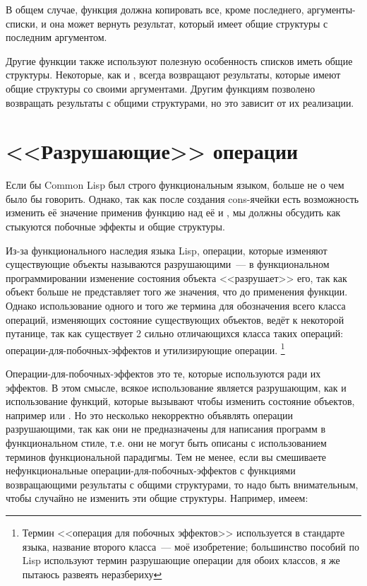 
В общем случае, функция  должна копировать все, кроме последнего,
аргументы-списки, и она может вернуть результат, который имеет общие структуры с последним
аргументом.

Другие функции также используют полезную особенность списков иметь общие
структуры. Некоторые, как и , всегда возвращают результаты, которые имеют
общие структуры со своими аргументами. Другим функциям позволено возвращать результаты с
общими структурами, но это зависит от их реализации.

\section{<<Разрушающие>> операции}

Если бы Common Lisp был строго функциональным языком, больше не о чем было бы
говорить. Однако, так как после создания cons-ячейки есть возможность изменить её значение
применив функцию  над её  и , мы должны обсудить как
стыкуются побочные эффекты и общие структуры.

Из-за функционального наследия языка Lisp, операции, которые изменяют существующие объекты
называются разрушающими~--- в функциональном программировании изменение состояния объекта
<<разрушает>> его, так как объект больше не представляет того же значения, что до применения
функции. Однако использование одного и того же термина для обозначения всего класса
операций, изменяющих состояние существующих объектов, ведёт к некоторой путанице,
так как существует 2 сильно отличающихся класса таких операций:
операции-для-побочных-эффектов и утилизирующие операции. \footnote{Термин <<операция для
  побочных эффектов>> используется в стандарте языка, название второго класса~--- моё
  изобретение; большинство пособий по Lisp используют термин разрушающие операции для
  обоих классов, я же пытаюсь развеять неразбериху}

Операции-для-побочных-эффектов это те, которые используются ради их эффектов. В этом
смысле, всякое использование  является разрушающим, как и использование
функций, которые вызывают  чтобы изменить состояние объектов, например
 или . Но это несколько некорректно объявлять операции
разрушающими, так как они не предназначены для написания программ в функциональном стиле,
т.е. они не могут быть описаны с использованием терминов функциональной парадигмы. Тем не
менее, если вы смешиваете нефункциональные операции-для-побочных-эффектов с функциями
возвращающими результаты с общими структурами, то надо быть внимательным, чтобы случайно
не изменить эти общие структуры. Например, имеем:

